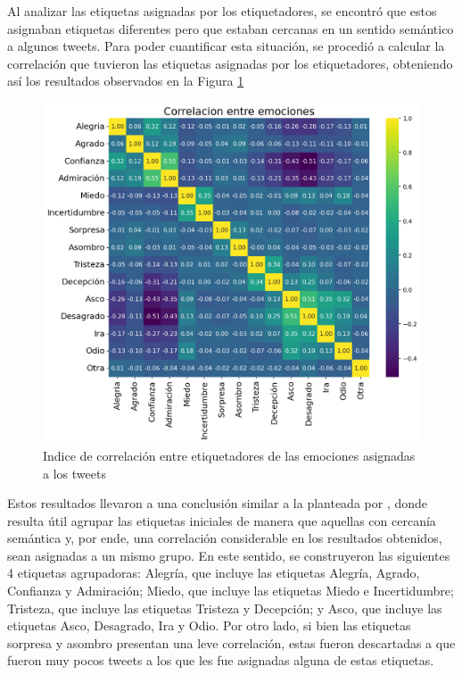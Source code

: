 \scriptsize

\normalsize


Al analizar las etiquetas asignadas por los etiquetadores, se encontró que estos asignaban etiquetas diferentes pero que estaban cercanas en un sentido semántico a algunos tweets. Para poder cuantificar esta situación, se procedió a calcular la correlación que tuvieron las etiquetas asignadas por los etiquetadores, obteniendo así los resultados observados en la Figura \ref{figure:correlacion_emociones}  

\begin{figure}[!htbp]
	\centering
	\includegraphics[scale=0.65]{Images & Logos/EDA/emotions_correlations.png} 
	\caption{Indice de correlación entre etiquetadores de las emociones asignadas a los tweets}
	\label{figure:correlacion_emociones}
\end{figure}


Estos resultados llevaron a una conclusión similar a la planteada por \cite{mohammad2015sentiment}, donde resulta útil agrupar las etiquetas iniciales de manera que aquellas con cercanía semántica y, por ende, una correlación considerable en los resultados obtenidos, sean asignadas a un mismo grupo. En este sentido, se construyeron las siguientes 4 etiquetas agrupadoras: Alegría, que incluye las etiquetas Alegría, Agrado, Confianza y Admiración; Miedo, que incluye las etiquetas Miedo e Incertidumbre; Tristeza, que incluye las etiquetas Tristeza y Decepción; y Asco, que incluye las etiquetas Asco, Desagrado, Ira y Odio. Por otro lado, si bien las etiquetas sorpresa y asombro presentan una leve correlación, estas fueron descartadas a que fueron muy pocos tweets a los que les fue asignadas alguna de estas etiquetas.

